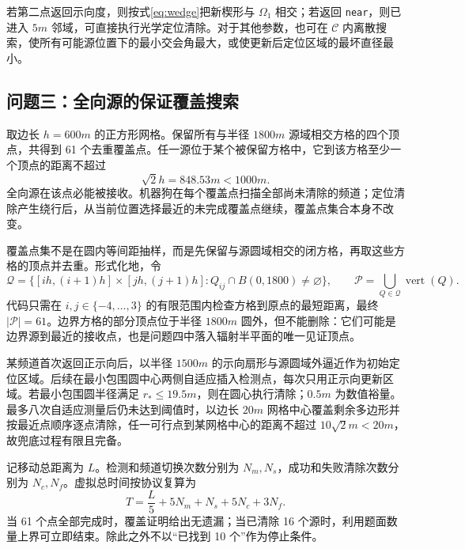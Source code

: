 若第二点返回示向度，则按式\eqref{eq:wedge}把新楔形与
$\Omega_1$ 相交；若返回 \texttt{near}，则已进入 $5\unit{m}$ 邻域，可直接执行光学定位清除。对于其他参数，也可在 $\mathcal C$ 内离散搜索，使所有可能源位置下的最小交会角最大，或使更新后定位区域的最坏直径最小。

\subsection{问题三：全向源的保证覆盖搜索}

取边长 $h=600\unit{m}$ 的正方形网格。保留所有与半径
$1800\unit{m}$ 源域相交方格的四个顶点，共得到 61 个去重覆盖点。任一源位于某个被保留方格中，它到该方格至少一个顶点的距离不超过
\begin{equation}
\sqrt{2}h=848.53\unit{m}<1000\unit{m}.
\label{eq:grid-cover}
\end{equation}
全向源在该点必能被接收。机器狗在每个覆盖点扫描全部尚未清除的频道；定位清除产生绕行后，从当前位置选择最近的未完成覆盖点继续，覆盖点集合本身不改变。

覆盖点集不是在圆内等间距抽样，而是先保留与源圆域相交的闭方格，再取这些方格的顶点并去重。形式化地，令
\begin{equation}
\mathcal Q=\{[ih,(i+1)h]\times[jh,(j+1)h]:Q_{ij}\cap B(0,1800)\ne\varnothing\},
\qquad
\mathcal P=\bigcup_{Q\in\mathcal Q}\operatorname{vert}(Q).
\label{eq:coverage-set}
\end{equation}
代码只需在 $i,j\in\{-4,\ldots,3\}$ 的有限范围内检查方格到原点的最短距离，最终 $|\mathcal P|=61$。边界方格的部分顶点位于半径 $1800\unit{m}$ 圆外，但不能删除：它们可能是边界源到最近的接收点，也是问题四中落入辐射半平面的唯一见证顶点。

某频道首次返回正示向后，以半径 $1500\unit{m}$ 的示向扇形与源圆域外逼近作为初始定位区域。后续在最小包围圆中心两侧自适应插入检测点，每次只用正示向更新区域。若最小包围圆半径满足
$r_*\le19.5\unit{m}$，则在圆心执行清除；$0.5\unit{m}$ 为数值裕量。最多八次自适应测量后仍未达到阈值时，以边长 $20\unit{m}$ 网格中心覆盖剩余多边形并按最近点顺序逐点清除，任一可行点到某网格中心的距离不超过
$10\sqrt2\unit{m}<20\unit{m}$，故兜底过程有限且完备。

记移动总距离为 $L$。检测和频道切换次数分别为 $N_m,N_s$，成功和失败清除次数分别为
$N_c,N_f$。虚拟总时间按协议复算为
\begin{equation}
T=\frac L5+5N_m+N_s+5N_c+3N_f.
\label{eq:time}
\end{equation}
当 61 个点全部完成时，覆盖证明给出无遗漏；当已清除 16 个源时，利用题面数量上界可立即结束。除此之外不以“已找到 10 个”作为停止条件。

